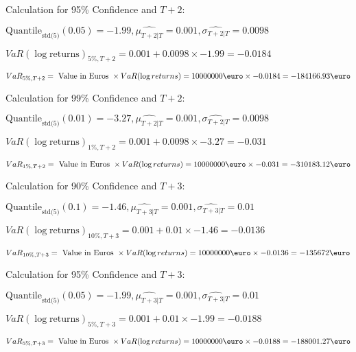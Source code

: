 Calculation for 95\% Confidence and $T+2$:

\indent\indent $\text{Quantile}_\text{std(5)}(0.05) = -1.99,\hat{\mu_{T+2|T}} = 0.001, \hat{\sigma_{T+2|T}} = 0.0098$

\indent\indent $VaR(\log \text{returns})_{5\%, T + 2} = 0.001 + 0.0098\times-1.99 = -0.0184$

\indent\indent $VaR_{5\%, T + 2} = \text{ Value in Euros } \times VaR(\log returns) = 10 000 000 \text{\euro} \times-0.0184 = -184166.93 \text{\euro}$\newline




Calculation for 99\% Confidence and $T+2$:

\indent\indent $\text{Quantile}_\text{std(5)}(0.01) = -3.27,\hat{\mu_{T+2|T}} = 0.001, \hat{\sigma_{T+2|T}} = 0.0098$

\indent\indent $VaR(\log \text{returns})_{1\%, T + 2} = 0.001 + 0.0098\times-3.27 = -0.031$

\indent\indent $VaR_{1\%, T + 2} = \text{ Value in Euros } \times VaR(\log returns) = 10 000 000 \text{\euro} \times-0.031 = -310183.12 \text{\euro}$\newline




Calculation for 90\% Confidence and $T+3$:

\indent\indent $\text{Quantile}_\text{std(5)}(0.1) = -1.46,\hat{\mu_{T+3|T}} = 0.001, \hat{\sigma_{T+3|T}} = 0.01$

\indent\indent $VaR(\log \text{returns})_{10\%, T + 3} = 0.001 + 0.01\times-1.46 = -0.0136$

\indent\indent $VaR_{10\%, T + 3} = \text{ Value in Euros } \times VaR(\log returns) = 10 000 000 \text{\euro} \times-0.0136 = -135672 \text{\euro}$\newline




Calculation for 95\% Confidence and $T+3$:

\indent\indent $\text{Quantile}_\text{std(5)}(0.05) = -1.99,\hat{\mu_{T+3|T}} = 0.001, \hat{\sigma_{T+3|T}} = 0.01$

\indent\indent $VaR(\log \text{returns})_{5\%, T + 3} = 0.001 + 0.01\times-1.99 = -0.0188$

\indent\indent $VaR_{5\%, T + 3} = \text{ Value in Euros } \times VaR(\log returns) = 10 000 000 \text{\euro} \times-0.0188 = -188001.27 \text{\euro}$\newline




